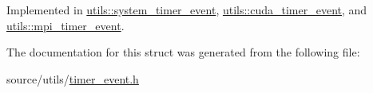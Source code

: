 Implemented in \hyperlink{structutils_1_1system__timer__event_a544e19f0a36e569d959d5c092050383b}{utils\-::system\-\_\-timer\-\_\-event}, \hyperlink{structutils_1_1cuda__timer__event_a2a2ec069b6be6608afe50f6762f26810}{utils\-::cuda\-\_\-timer\-\_\-event}, and \hyperlink{structutils_1_1mpi__timer__event_a8929b157ca17992c0d2101eb099a7cc7}{utils\-::mpi\-\_\-timer\-\_\-event}.



The documentation for this struct was generated from the following file\-:\begin{DoxyCompactItemize}
\item 
source/utils/\hyperlink{timer__event_8h}{timer\-\_\-event.\-h}\end{DoxyCompactItemize}
